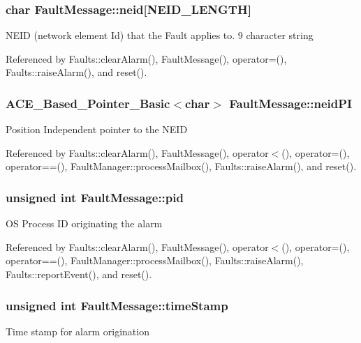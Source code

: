 \subsubsection[{neid}]{\setlength{\rightskip}{0pt plus 5cm}char Fault\+Message\+::neid[N\+E\+I\+D\+\_\+\+L\+E\+N\+G\+TH]}\label{structFaultMessage_ab9f4d48f5451798fb95dcca348118535}
N\+E\+ID (network element Id) that the Fault applies to. 9 character string 

Referenced by Faults\+::clear\+Alarm(), Fault\+Message(), operator=(), Faults\+::raise\+Alarm(), and reset().

\subsubsection[{neid\+PI}]{\setlength{\rightskip}{0pt plus 5cm}A\+C\+E\+\_\+\+Based\+\_\+\+Pointer\+\_\+\+Basic$<$char$>$ Fault\+Message\+::neid\+PI}\label{structFaultMessage_af4985a4765181e55dfdc16464f6b9c0a}
Position Independent pointer to the N\+E\+ID 

Referenced by Faults\+::clear\+Alarm(), Fault\+Message(), operator$<$(), operator=(), operator==(), Fault\+Manager\+::process\+Mailbox(), Faults\+::raise\+Alarm(), and reset().

\subsubsection[{pid}]{\setlength{\rightskip}{0pt plus 5cm}unsigned int Fault\+Message\+::pid}\label{structFaultMessage_a28230466de03857454649d3e16f84594}
OS Process ID originating the alarm 

Referenced by Faults\+::clear\+Alarm(), Fault\+Message(), operator$<$(), operator=(), operator==(), Fault\+Manager\+::process\+Mailbox(), Faults\+::raise\+Alarm(), Faults\+::report\+Event(), and reset().

\subsubsection[{time\+Stamp}]{\setlength{\rightskip}{0pt plus 5cm}unsigned int Fault\+Message\+::time\+Stamp}\label{structFaultMessage_a22b2d875be78a7143b0916f5e86fd1f4}
Time stamp for alarm origination 

